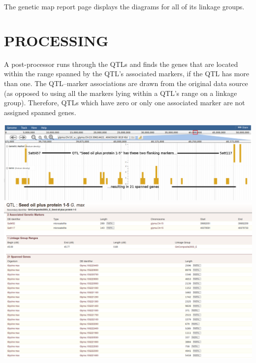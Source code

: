 \documentclass[]{pagposter}
\newlength{\figwidth}
\begin{document}
\begin{multicols*}{3}
  The genetic map report page displays the diagrams for all of its linkage groups.

  \section*{PROCESSING}

  A post-processor runs through the QTLs and finds the genes that are located within the range spanned by the QTL's associated markers, if the QTL has more than one. The QTL--marker associations
  are drawn from the original data source (as opposed to using all the markers lying within a QTL's range on a linkage group). Therefore, QTLs which have zero or only one associated marker are not
  assigned spanned genes.

  \begin{center}
    \includegraphics[width=\figwidth]{genetic-marker-jbrowse.png} %
    \vspace{24pt}
    \includegraphics[width=\figwidth]{QTL-report.png} %
\end{center}
\end{multicols*}
\end{document}
